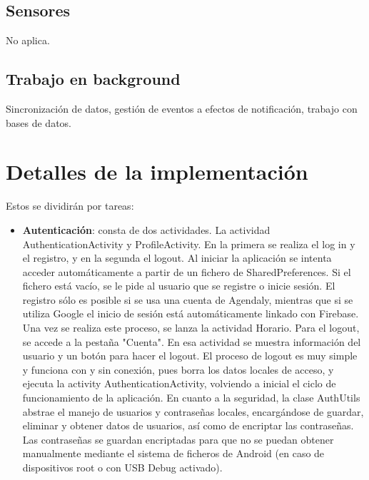\documentclass[a4paper,openright,12pt]{article}
\begin{document}
\subsection{Sensores}
No aplica.
\subsection{Trabajo en background}
Sincronización de datos, gestión de eventos a efectos de notificación, trabajo con bases de datos.

\section{Detalles de la implementación}
Estos se dividirán por tareas:
\begin{itemize}
    \item \textbf{Autenticación}: consta de dos actividades. La actividad AuthenticationActivity y ProfileActivity. En la primera se realiza el log in y el registro, y en la segunda el logout. Al iniciar la aplicación se intenta acceder automáticamente a partir de un fichero de SharedPreferences. Si el fichero está vacío, se le pide al usuario que se registre o inicie sesión. El registro sólo es posible si se usa una cuenta de Agendaly, mientras que si se utiliza Google el inicio de sesión está automáticamente linkado con Firebase. Una vez se realiza este proceso, se lanza la actividad Horario. 
    \newline
    Para el logout, se accede a la pestaña "Cuenta". En esa actividad se muestra información del usuario y un botón para hacer el logout. El proceso de logout es muy simple y funciona con y sin conexión, pues borra los datos locales de acceso, y ejecuta la activity AuthenticationActivity, volviendo a inicial el ciclo de funcionamiento de la aplicación.
    \newline
    En cuanto a la seguridad, la clase AuthUtils abstrae el manejo de usuarios y contraseñas locales, encargándose de guardar, eliminar y obtener datos de usuarios, así como de encriptar las contraseñas. Las contraseñas se guardan encriptadas para que no se puedan obtener manualmente mediante el sistema de ficheros de Android (en caso de dispositivos root o con USB Debug activado).
        
\end{itemize}
\end{document}
